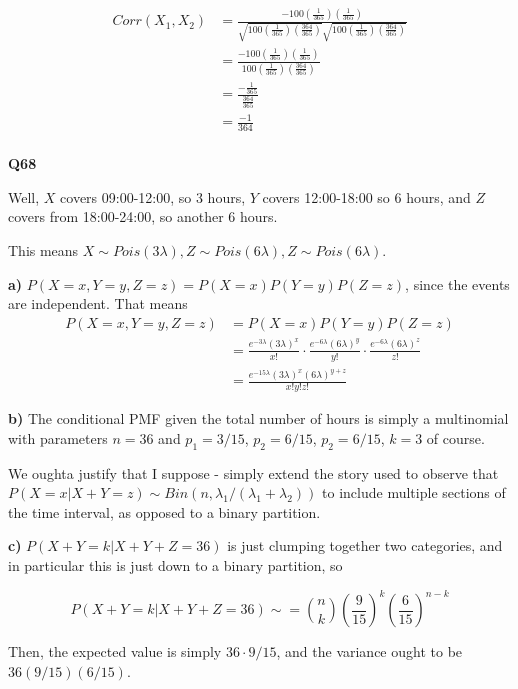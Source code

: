\documentclass{article}
\begin{document}
			\begin{align*}
			Corr(X_1, X_2) &= \frac{-100\left(\frac{1}{365}\right)\left(\frac{1}{365}\right)}{\sqrt{100\left(\frac{1}{365}\right)\left(\frac{364}{365}\right)}\sqrt{100\left(\frac{1}{365}\right)\left(\frac{364}{365}\right)}}\\
			&= \frac{-100\left(\frac{1}{365}\right)\left(\frac{1}{365}\right)}{100\left(\frac{1}{365}\right)\left(\frac{364}{365}\right)} \\
			&= \frac{-\frac{1}{365}}{\frac{364}{365}}\\
			&= \frac{-1}{364}\\ 
			\end{align*}
			
			\hfill
			
		\textbf{Q68}
		
			Well, $X$ covers 09:00-12:00, so 3 hours, $Y$ covers 12:00-18:00 so 6 hours, and $Z$ covers from 18:00-24:00, so another 6 hours. 
			
			This means $X\sim Pois(3\lambda), Z\sim Pois(6\lambda), Z\sim Pois(6\lambda)$.
			
			\textbf{a)} $P(X=x, Y=y, Z=z) = P(X=x)P(Y=y)P(Z=z)$, since the events are independent. That means
			\begin{align*}
			P(X=x, Y=y, Z=z) &= P(X=x)P(Y=y)P(Z=z)\\
			&= \frac{e^{-3\lambda}(3\lambda)^{x}}{x!}\cdot \frac{e^{-6\lambda}(6\lambda)^{y}}{y!}\cdot \frac{e^{-6\lambda}(6\lambda)^{z}}{z!}\\
			&= \frac{e^{-15\lambda}(3\lambda)^{x}(6\lambda)^{y+z}}{x!y!z!}
			\end{align*}
			
			\textbf{b)} The conditional PMF given the total number of hours is simply a multinomial with parameters $n=36$ and $p_1 = 3/15$, $p_2 = 6/15$, $p_2 = 6/15$, $k=3$ of course.
			
			We oughta justify that I suppose - simply extend the story used to observe that $P(X=x|X+Y=z) \sim Bin(n, \lambda_1/(\lambda_1+\lambda_2))$ to include multiple sections of the time interval, as opposed to a binary partition.
			
			\textbf{c)} $P(X+Y=k|X+Y+Z=36)$ is just clumping together two categories, and in particular this is just down to a binary partition, so 
			
			\[P(X+Y=k|X+Y+Z=36)\sim = {n\choose k} \left(\frac{9}{15}\right)^k\left( \frac{6}{15}\right)^{n-k} \]
			
			Then, the expected value is simply $36\cdot 9/15$, and the variance ought to be $36(9/15)(6/15)$.			
			
\end{document}
